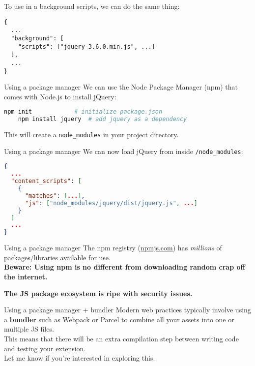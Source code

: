 \documentclass[../index.tex]{subfiles}
\begin{document}
\begin{frame}[fragile]{\currenttitle}
  To use in a background scripts, we can do the same thing:

  \begin{lstlisting}[language=ES6]
{
  ...
  "background": [
    "scripts": ["jquery-3.6.0.min.js", ...]
  ],
  ...
}
  \end{lstlisting}
\end{frame}

\renewcommand{\currenttitle}{Using a package manager}
\begin{frame}[fragile]{\currenttitle}
  We can use the Node Package Manager (npm) that comes with Node.js to install
  jQuery:

  \begin{lstlisting}[language=Bash,basicstyle=\ttfamily\small]
    npm init            # initialize package.json
    npm install jquery  # add jquery as a dependency
  \end{lstlisting}

  \vspace*{1em}
  This will create a \texttt{node\_modules} in your project directory.

\end{frame}

\begin{frame}[fragile]{\currenttitle}
  We can now load jQuery from inside \texttt{/node\_modules}:

  \begin{lstlisting}[language=json]
{
  ...
  "content_scripts": [
    {
      "matches": [...],
      "js": ["node_modules/jquery/dist/jquery.js", ...]
    }
  ]
  ...
}
  \end{lstlisting}
\end{frame}

\begin{frame}[fragile]{\currenttitle}
  The npm registry (\url{npmjs.com}) has \textit{millions} of
  packages/libraries available for use. \\[2em]

  \textbf{Beware: Using npm is no different from downloading random crap off
  the internet.}

  \textbf{The JS package ecosystem is ripe with security issues.}
\end{frame}

\renewcommand{\currenttitle}{Using a package manager + bundler}
\begin{frame}[fragile]{\currenttitle}
  Modern web practices typically involve using a \textbf{bundler} such as
  Webpack or Parcel to combine all your assets into one or multiple JS files.
  \\[1em]

  This means that there will be an extra compilation step between writing code
  and testing your extension. \\[3em]

  Let me know if you're interested in exploring this.
\end{frame}
\end{document}
